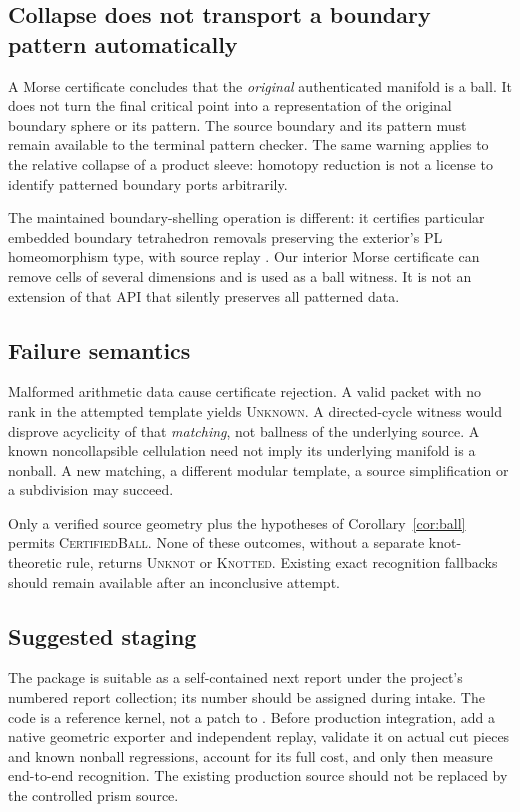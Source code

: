 \documentclass[11pt,letterpaper]{article}
\theoremstyle{definition}
\theoremstyle{remark}\newtheorem{remark}[theorem]{Remark}
\newcommand{\code}[1]{\texttt{\detokenize{#1}}}
\newcommand{\Ball}{\textsc{CertifiedBall}}
\newcommand{\Unknown}{\textsc{Unknown}}
\begin{document}
\subsection{Collapse does not transport a boundary pattern automatically}

A Morse certificate concludes that the \emph{original} authenticated manifold is a ball. It does not turn the final critical point into a representation of the original boundary sphere or its pattern. The source boundary and its pattern must remain available to the terminal pattern checker. The same warning applies to the relative collapse of a product sleeve: homotopy reduction is not a license to identify patterned boundary ports arbitrarily.

The maintained boundary-shelling operation is different: it certifies particular embedded boundary tetrahedron removals preserving the exterior's PL homeomorphism type, with source replay \cite{repo-shellings}. Our interior Morse certificate can remove cells of several dimensions and is used as a ball witness. It is not an extension of that API that silently preserves all patterned data.

\subsection{Failure semantics}

Malformed arithmetic data cause certificate rejection. A valid packet with no rank in the attempted template yields \Unknown. A directed-cycle witness would disprove acyclicity of that \emph{matching}, not ballness of the underlying source. A known noncollapsible cellulation need not imply its underlying manifold is a nonball. A new matching, a different modular template, a source simplification or a subdivision may succeed.

Only a verified source geometry plus the hypotheses of Corollary~\ref{cor:ball} permits \Ball. None of these outcomes, without a separate knot-theoretic rule, returns \textsc{Unknot} or \textsc{Knotted}. Existing exact recognition fallbacks should remain available after an inconclusive attempt.

\subsection{Suggested staging}

The package is suitable as a self-contained next report under the project's numbered report collection; its number should be assigned during intake. The code is a reference kernel, not a patch to \code{fastunknot}. Before production integration, add a native geometric exporter and independent replay, validate it on actual cut pieces and known nonball regressions, account for its full cost, and only then measure end-to-end recognition. The existing production source should not be replaced by the controlled prism source.
\end{document}
